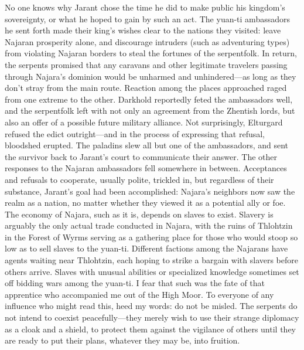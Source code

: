 \documentclass[10pt,a4paper,twoside,twocolumn,openany,bg=print,nodeprecatedcode]{dndbook}
\begin{document}
No one knows why Jarant chose the time he did to make public his kingdom's sovereignty, or what he hoped to gain by such an act. The yuan-ti ambassadors he sent forth made their king's wishes clear to the nations they visited: leave Najaran prosperity alone, and discourage intruders (such as adventuring types) from violating Najaran borders to steal the fortunes of the serpentfolk. In return, the serpents promised that any caravans and other legitimate travelers passing through Najara's dominion would be unharmed and unhindered—as long as they don't stray from the main route.
Reaction among the places approached raged from one extreme to the other. Darkhold reportedly feted the ambassadors well, and the serpentfolk left with not only an agreement from the Zhentish lords, but also an offer of a possible future military alliance. Not surprisingly, Elturgard refused the edict outright—and in the process of expressing that refusal, bloodshed erupted. The paladins slew all but one of the ambassadors, and sent the survivor back to Jarant's court to communicate their answer.
The other responses to the Najaran ambassadors fell somewhere in between. Acceptances and refusals to cooperate, usually polite, trickled in, but regardless of their substance, Jarant's goal had been accomplished: Najara's neighbors now saw the realm as a nation, no matter whether they viewed it as a potential ally or foe.
The economy of Najara, such as it is, depends on slaves to exist. Slavery is arguably the only actual trade conducted in Najara, with the ruins of Thlohtzin in the Forest of Wyrms serving as a gathering place for those who would stoop so low as to sell slaves to the yuan-ti. Different factions among the Najarans have agents waiting near Thlohtzin, each hoping to strike a bargain with slavers before others arrive. Slaves with unusual abilities or specialized knowledge sometimes set off bidding wars among the yuan-ti. I fear that such was the fate of that apprentice who accompanied me out of the High Moor.
To everyone of any influence who might read this, heed my words: do not be misled. The serpents do not intend to coexist peacefully—they merely wish to use their strange diplomacy as a cloak and a shield, to protect them against the vigilance of others until they are ready to put their plans, whatever they may be, into fruition.
\end{document}
